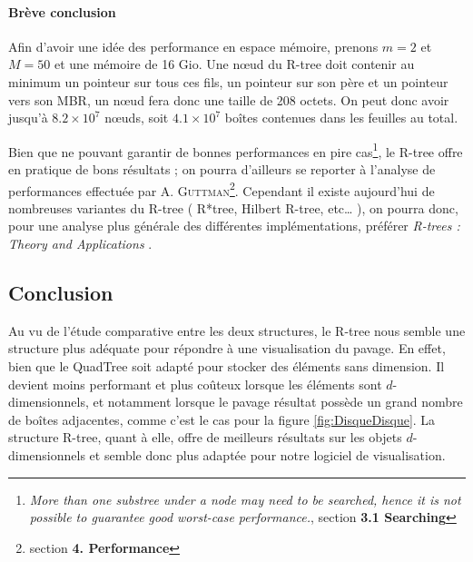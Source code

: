 \paragraph{Brève conclusion} Afin d'avoir une idée des performance en espace mémoire, prenons $m=2$ et $M=50$ et une mémoire de 16 Gio. Une nœud du R-tree doit contenir au minimum un pointeur sur tous ces fils, un pointeur sur son père et un pointeur vers son MBR, un nœud fera donc une taille de 208 octets. On peut donc avoir jusqu'à $8.2 \times 10^7$ nœuds, soit $4.1 \times 10^7$ boîtes contenues dans les feuilles au total.   

 Bien que ne pouvant garantir de bonnes performances en pire cas\footnote{\og \emph{More than one substree under a node may need to be searched, hence it is not possible to guarantee good worst-case performance.}\fg{}\cite{Guttman}, section \textbf{3.1 Searching}}, le R-tree offre en pratique de bons résultats ; on pourra d'ailleurs se reporter à l'analyse de performances effectuée par A. \textsc{Guttman}\footnote{section \textbf{4. Performance}\cite{Guttman}}. Cependant il existe aujourd'hui de nombreuses variantes du R-tree ( R*tree, Hilbert R-tree, etc\dots{} ), on pourra donc, pour une analyse plus générale des différentes implémentations, préférer \emph{R-trees : Theory and Applications} \cite{poulos}.

\subsection{Conclusion}
Au vu de l'étude comparative entre les deux structures, le R-tree nous semble une structure plus adéquate pour répondre à une visualisation du pavage. En effet, bien que le QuadTree soit adapté pour stocker des éléments sans dimension. Il devient moins performant et plus coûteux lorsque les éléments sont $d$-dimensionnels, et notamment lorsque le pavage résultat possède un grand nombre de boîtes adjacentes, comme c'est le cas pour la figure \ref{fig:DisqueDisque}. La structure R-tree, quant à elle, offre de meilleurs résultats sur les objets $d$-dimensionnels et semble donc plus adaptée pour notre logiciel de visualisation.
